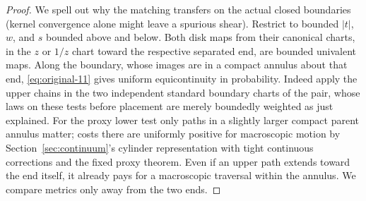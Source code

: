 \begin{proof}

We spell out why the matching transfers on the actual closed boundaries (kernel convergence alone might leave a spurious shear).
Restrict to bounded \(|t|\), \(w\), and \(s\) bounded above and below.
Both disk maps from their canonical charts, in the \(z\) or \(1/z\) chart toward the respective separated end, are bounded univalent maps.
Along the boundary, whose images are in a compact annulus about that end, \eqref{eq:original-11} gives uniform equicontinuity in probability.
Indeed apply the upper chains in the two independent standard boundary charts of the pair, whose laws on these tests before placement are merely boundedly weighted as just explained.
For the proxy lower test only paths in a slightly larger compact parent annulus matter; costs there are uniformly positive for macroscopic motion by Section~\ref{sec:continuum}'s cylinder representation with tight continuous corrections and the fixed proxy theorem.
Even if an upper path extends toward the end itself, it already pays for a macroscopic traversal within the annulus.
We compare metrics only away from the two ends.


\end{proof}
